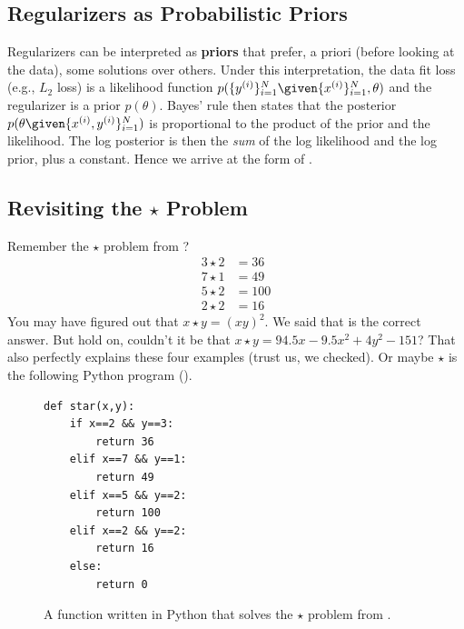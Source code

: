 \subsection{Regularizers as Probabilistic Priors} Regularizers can be interpreted as \textbf{priors} that prefer, a priori (before looking at the data), some solutions over others. Under this interpretation, the data fit loss (e.g., $L_2$ loss) is a likelihood function $p(\{y^{(i)}\}^N_{i=1} \given \{x^{(i)}\}^N_{i=1}, \theta)$ and the regularizer is a prior $p(\theta)$. Bayes' rule then states that the posterior $p(\theta \given \{x^{(i)}, y^{(i)}\}^N_{i=1})$ is proportional to the product of the prior and the likelihood. The log posterior is then the \textit{sum} of the log likelihood and the log prior, plus a constant. Hence we arrive at the form of \eqn{\ref{eqn:problem_of_generalization:regularized_objective}}.

\subsection{Revisiting the $\star$ Problem}\label{sec:problem_of_generalization:star_problem_revisited}
Remember the $\star$ problem from \chap{\ref{chapter:intro_to_learning}}?
\begin{align}
    3 \star 2 &= 36\nonumber \\
    7 \star 1 &= 49\nonumber \\
    5 \star 2 &= 100\nonumber \\
    2 \star 2 &= 16\nonumber
\end{align}
You may have figured out that $x \star y = (xy)^2$. We said that is the correct answer. But hold on, couldn't it be that $x \star y =  94.5x - 9.5x^2 + 4y^2 - 151$? That also perfectly explains these four examples (trust us, we checked). Or maybe $\star$ is the following Python program (\fig{\ref{fig:problem_of_generalization:python_star_solution}}).
\begin{figure}[h]
\begin{minipage}{1.0\linewidth}
\begin{verbatim}
def star(x,y):
    if x==2 && y==3:
        return 36
    elif x==7 && y==1:
        return 49
    elif x==5 && y==2:
        return 100
    elif x==2 && y==2:
        return 16
    else:
        return 0
\end{verbatim}
\end{minipage}
\caption{A function written in Python that solves the $\star$ problem from \chap{\ref{chapter:intro_to_learning}}.}
\label{fig:problem_of_generalization:python_star_solution}
\end{figure}

